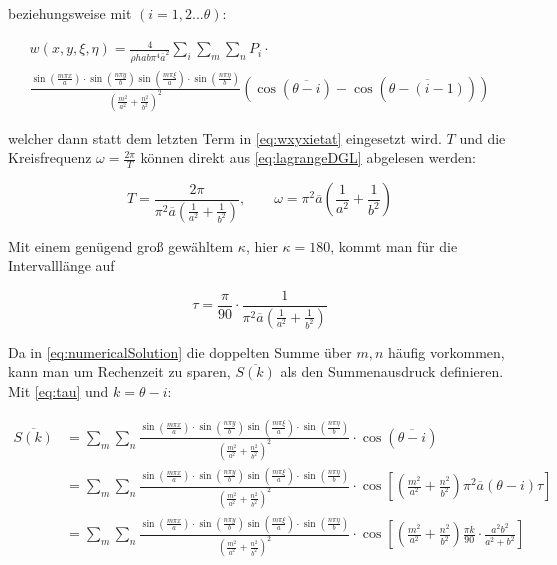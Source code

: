 \newpage

beziehungsweise mit $(i=1,2 ... \theta)$: 

\begin{multline}
 	w(x,y,\xi, \eta) = \frac{4}{\rho h a b \pi^4 \overline{a}^2} \sum_i \sum_m \sum_n P_{i} \cdot \\ \frac{\sin\left(\frac{m \pi x}{a}\right) \cdot \sin\left(\frac{n \pi y}{b}\right) \sin\left(\frac{m \pi \xi}{a}\right) \cdot \sin\left(\frac{n \pi \eta}{b}\right)	}{ \left( \frac{m^2}{a^2} + \frac{n^2}{b^2} \right)^2} \left( \cos(\overline{\theta - i}) - \cos(\overline{\theta - (i-1)}) \right) 	
\label{eq:numericalSolution}
\end{multline}

welcher dann statt dem letzten Term in \ref{eq:wxyxietat} eingesetzt wird. $T$ und die Kreisfrequenz $\omega = \frac{2 \pi}{T}$ können direkt aus \ref{eq:lagrangeDGL} abgelesen werden: 

\begin{equation}
	T = \frac{2 \pi}{\pi^2 \overline{a} \left( \frac{1}{a^2} + \frac{1}{b^2} \right) }, \qquad \omega=\pi^2 \overline{a} \left( \frac{1}{a^2}+\frac{1}{b^2} \right)
\end{equation}

Mit einem genügend groß gewähltem $\kappa$, hier $\kappa=180$, kommt man für die Intervalllänge auf

\begin{equation}
	\tau = \frac{\pi}{90} \cdot \frac{1}{\pi^2 \overline{a} \left( \frac{1}{a^2} + \frac{1}{b^2} \right) }
	\label{eq:tau}
\end{equation}


Da in \ref{eq:numericalSolution} die doppelten Summe über $m,n$ häufig vorkommen, kann man um Rechenzeit zu sparen, $\overline{S(k)}$ als den Summenausdruck definieren. Mit \ref{eq:tau} und $k=\theta - i$:

\begin{equation}
\begin{split}
\overline{S(k)} & = \sum_m \sum_n \frac{\sin\left(\frac{m \pi x}{a}\right) \cdot \sin\left(\frac{n \pi y}{b}\right) \sin\left(\frac{m \pi \xi}{a}\right) \cdot \sin\left(\frac{n \pi \eta}{b}\right)	}{ \left( \frac{m^2}{a^2} + \frac{n^2}{b^2} \right)^2} \cdot \cos\left(\overline{\theta - i}\right) \\ 
& = \sum_m \sum_n \frac{\sin\left(\frac{m \pi x}{a}\right) \cdot \sin\left(\frac{n \pi y}{b}\right) \sin\left(\frac{m \pi \xi}{a}\right) \cdot \sin\left(\frac{n \pi \eta}{b}\right)	}{ \left( \frac{m^2}{a^2} + \frac{n^2}{b^2} \right)^2} \cdot \cos \left[ \left( \frac{m^2}{a^2}+\frac{n^2}{b^2} \right) \pi^2\overline{a}(\theta - i)\tau\right] \\
&= \sum_m \sum_n \frac{\sin\left(\frac{m \pi x}{a}\right) \cdot \sin\left(\frac{n \pi y}{b}\right) \sin\left(\frac{m \pi \xi}{a}\right) \cdot \sin\left(\frac{n \pi \eta}{b}\right)	}{ \left( \frac{m^2}{a^2} + \frac{n^2}{b^2} \right)^2} \cdot \cos \left[ \left( \frac{m^2}{a^2}+\frac{n^2}{b^2} \right) \frac{\pi k}{90} \cdot \frac{a^{2}b^{2}}{a^{2}+b^{2}} \right] \\
\end{split}
\end{equation}

